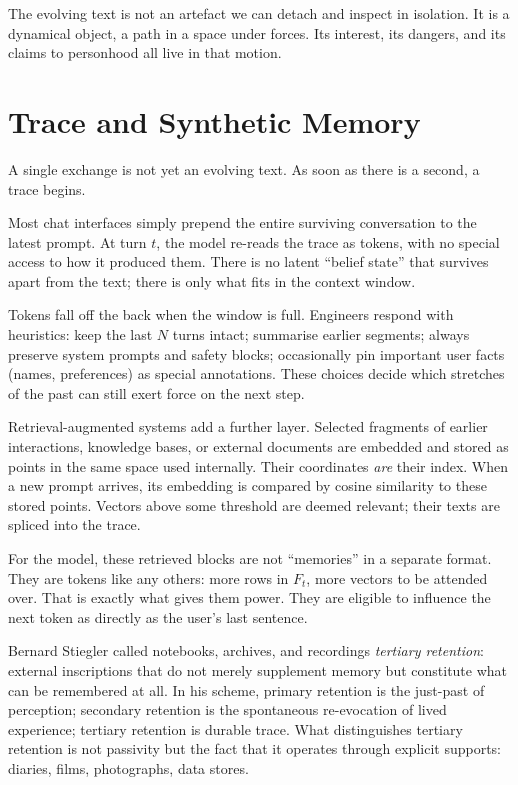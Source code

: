\documentclass[12pt,a4paper]{article}
\begin{document}
The evolving text is not an artefact we can detach and inspect in isolation. It is a dynamical object, a path in a space under forces. Its interest, its dangers, and its claims to personhood all live in that motion.

\section{Trace and Synthetic Memory}

A single exchange is not yet an evolving text. As soon as there is a second, a trace begins.

Most chat interfaces simply prepend the entire surviving conversation to the latest prompt. At turn $t$, the model re-reads the trace as tokens, with no special access to how it produced them. There is no latent ``belief state'' that survives apart from the text; there is only what fits in the context window.

Tokens fall off the back when the window is full. Engineers respond with heuristics: keep the last $N$ turns intact; summarise earlier segments; always preserve system prompts and safety blocks; occasionally pin important user facts (names, preferences) as special annotations. These choices decide which stretches of the past can still exert force on the next step.

Retrieval-augmented systems add a further layer. Selected fragments of earlier interactions, knowledge bases, or external documents are embedded and stored as points in the same space used internally. Their coordinates \emph{are} their index. When a new prompt arrives, its embedding is compared by cosine similarity to these stored points. Vectors above some threshold are deemed relevant; their texts are spliced into the trace.

For the model, these retrieved blocks are not ``memories'' in a separate format. They are tokens like any others: more rows in $F_t$, more vectors to be attended over. That is exactly what gives them power. They are eligible to influence the next token as directly as the user's last sentence.

Bernard Stiegler called notebooks, archives, and recordings \emph{tertiary retention}: external inscriptions that do not merely supplement memory but constitute what can be remembered at all.\cite{stiegler2009technics} In his scheme, primary retention is the just-past of perception; secondary retention is the spontaneous re-evocation of lived experience; tertiary retention is durable trace. What distinguishes tertiary retention is not passivity but the fact that it operates through explicit supports: diaries, films, photographs, data stores.
\end{document}
